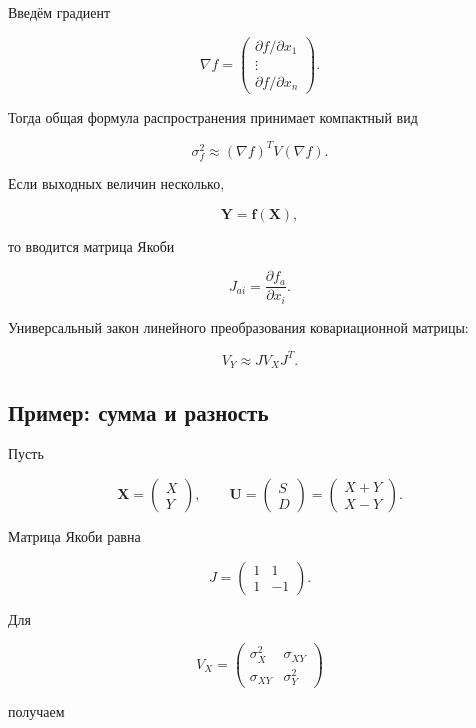 \documentclass[
  russian,
  12pt,
  a4paper,
  a4paper,
  openany]{scrbook}
\begin{document}
Введём градиент

\[
\nabla f
=
\begin{pmatrix}
\partial f/\partial x_1\\
\vdots\\
\partial f/\partial x_n
\end{pmatrix}.
\]

Тогда общая формула распространения принимает компактный вид

\[
\boxed{
\sigma_f^2
\approx
(\nabla f)^TV(\nabla f).
}
\]

Если выходных величин несколько,

\[
\mathbf Y=\mathbf f(\mathbf X),
\]

то вводится матрица Якоби

\[
J_{ai}=\frac{\partial f_a}{\partial x_i}.
\]

Универсальный закон линейного преобразования ковариационной матрицы:

\[
\boxed{
V_Y\approx JV_XJ^T.
}
\]

\subsection{Пример: сумма и
разность}\label{ux43fux440ux438ux43cux435ux440-ux441ux443ux43cux43cux430-ux438-ux440ux430ux437ux43dux43eux441ux442ux44c}

Пусть

\[
\mathbf X=
\begin{pmatrix}X\\Y\end{pmatrix},
\qquad
\mathbf U=
\begin{pmatrix}S\\D\end{pmatrix}
=
\begin{pmatrix}X+Y\\X-Y\end{pmatrix}.
\]

Матрица Якоби равна

\[
J=
\begin{pmatrix}
1&1\\
1&-1
\end{pmatrix}.
\]

Для

\[
V_X=
\begin{pmatrix}
\sigma_X^2&\sigma_{XY}\\
\sigma_{XY}&\sigma_Y^2
\end{pmatrix}
\]

получаем
\end{document}
